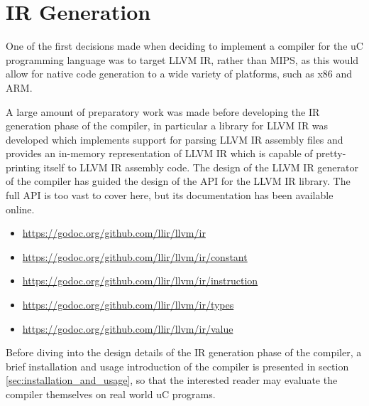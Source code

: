 
\section{IR Generation}
\label{sec:ir_generation}

One of the first decisions made when deciding to implement a compiler for the uC programming language was to target LLVM IR, rather than MIPS, as this would allow for native code generation to a wide variety of platforms, such as x86 and ARM.

A large amount of preparatory work was made before developing the IR generation phase of the compiler, in particular a library for LLVM IR was developed which implements support for parsing LLVM IR assembly files and provides an in-memory representation of LLVM IR which is capable of pretty-printing itself to LLVM IR assembly code. The design of the LLVM IR generator of the compiler has guided the design of the API for the LLVM IR library. The full API is too vast to cover here, but its documentation has been available online.

\begin{itemize}
	\item \url{https://godoc.org/github.com/llir/llvm/ir}
	\item \url{https://godoc.org/github.com/llir/llvm/ir/constant}
	\item \url{https://godoc.org/github.com/llir/llvm/ir/instruction}
	\item \url{https://godoc.org/github.com/llir/llvm/ir/types}
	\item \url{https://godoc.org/github.com/llir/llvm/ir/value}
\end{itemize}

Before diving into the design details of the IR generation phase of the compiler, a brief installation and usage introduction of the compiler is presented in section \ref{sec:installation_and_usage}, so that the interested reader may evaluate the compiler themselves on real world uC programs.




%

